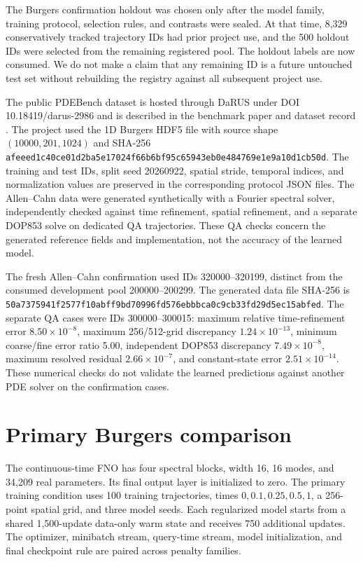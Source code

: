 \documentclass[10pt,a4paper]{article}
\begin{document}
The Burgers confirmation holdout was chosen only after the model family, training protocol, selection rules, and contrasts were sealed. At that time, 8,329 conservatively tracked trajectory IDs had prior project use, and the 500 holdout IDs were selected from the remaining registered pool. The holdout labels are now consumed. We do not make a claim that any remaining ID is a future untouched test set without rebuilding the registry against all subsequent project use.

The public PDEBench dataset is hosted through DaRUS under DOI 10.18419/darus-2986 and is described in the benchmark paper and dataset record \citep{takamoto2022pdebench,pdebench_dataset}. The project used the 1D Burgers HDF5 file with source shape $(10000,201,1024)$ and SHA-256 \texttt{afeeed1c\allowbreak40ce01d2\allowbreak ba5e1702\allowbreak 4f66b6bf\allowbreak 95c65943\allowbreak eb0e4847\allowbreak 69e1e9a1\allowbreak 0d1cb50d}. The training and test IDs, split seed 20260922, spatial stride, temporal indices, and normalization values are preserved in the corresponding protocol JSON files. The Allen--Cahn data were generated synthetically with a Fourier spectral solver, independently checked against time refinement, spatial refinement, and a separate DOP853 solve on dedicated QA trajectories. These QA checks concern the generated reference fields and implementation, not the accuracy of the learned model.

The fresh Allen--Cahn confirmation used IDs 320000--320199, distinct from the consumed development pool 200000--200299. The generated data file SHA-256 is \texttt{50a73759\allowbreak 41f2577f\allowbreak 10abff9b\allowbreak d70996fd\allowbreak 576ebbbc\allowbreak a0c9cb33\allowbreak fd29d5ec\allowbreak 15abfed}. The separate QA cases were IDs 300000--300015: maximum relative time-refinement error $8.50\times10^{-8}$, maximum 256/512-grid discrepancy $1.24\times10^{-13}$, minimum coarse/fine error ratio 5.00, independent DOP853 discrepancy $7.49\times10^{-8}$, maximum resolved residual $2.66\times10^{-7}$, and constant-state error $2.51\times10^{-14}$. These numerical checks do not validate the learned predictions against another PDE solver on the confirmation cases.

\section{Primary Burgers comparison}
The continuous-time FNO has four spectral blocks, width 16, 16 modes, and 34,209 real parameters. Its final output layer is initialized to zero. The primary training condition uses 100 training trajectories, times $0,0.1,0.25,0.5,1$, a 256-point spatial grid, and three model seeds. Each regularized model starts from a shared 1,500-update data-only warm state and receives 750 additional updates. The optimizer, minibatch stream, query-time stream, model initialization, and final checkpoint rule are paired across penalty families.
\end{document}
